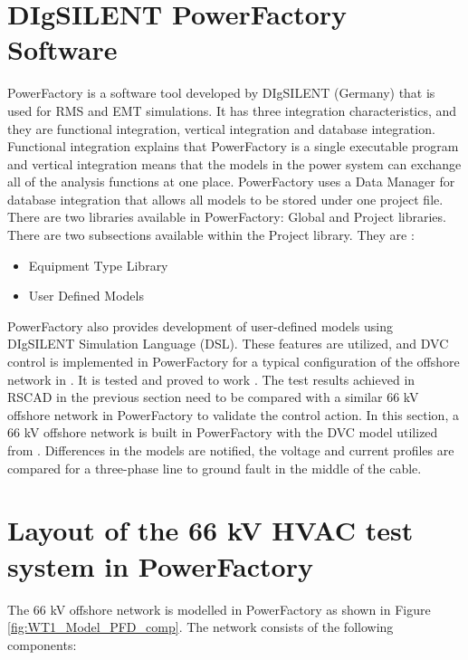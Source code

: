 \section{DIgSILENT PowerFactory Software}
PowerFactory is a software tool developed by DIgSILENT (Germany) that is used for RMS and EMT simulations. It has three integration characteristics, and they are functional integration, vertical integration and database integration. Functional integration explains that PowerFactory is a single executable program and vertical integration means that the models in the power system can exchange all of the analysis functions at one place. PowerFactory uses a Data Manager for database integration that allows all models to be stored under one project file. There are two libraries available in PowerFactory: Global and Project libraries. There are two subsections available within the Project library. They are \cite{powerfactory_tech}:
\begin{itemize}
    \item Equipment Type Library
    \item User Defined Models
\end{itemize}
PowerFactory also provides development of user-defined models using DIgSILENT Simulation Language (DSL). These features are utilized, and \gls{DVC} control is implemented in PowerFactory for a typical configuration of the offshore network in \cite{korai_dynamic_2019}. It is tested and proved to work \cite{korai_dynamic_2019}. The test results achieved in RSCAD in the previous section need to be compared with a similar 66 kV offshore network in PowerFactory to validate the control action. In this section, a 66 kV offshore network is built in PowerFactory with the \gls{DVC} model utilized from \cite{korai_dynamic_2019}. Differences in the models are notified, the voltage and current profiles are compared for a three-phase line to ground fault in the middle of the cable.

\section{Layout of the 66 kV HVAC test system in PowerFactory}

The 66 kV offshore network is modelled in PowerFactory as shown in Figure \ref{fig:WT1_Model_PFD_comp}. The network consists of the following components:

